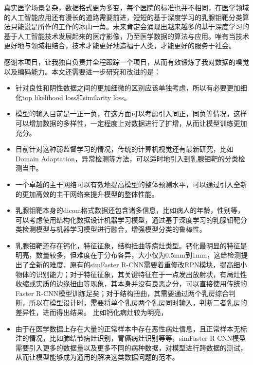 真实医学场景复杂，数据格式更为多变，每个医院的标准也并不相同，在医学领域的人工智能应用还有漫长的道路需要前进，短短的基于深度学习的乳腺钼靶分类算法只能说是所作的工作的冰山一角。未来肯定会涌现出越来越多的基于深度学习的基于人工智能技术发展起来的医疗影像，乃至医学数据的算法与应用。唯有当技术更好地与领域相结合，技术才能更好地造福于人类，才能更好的服务于社会。

感谢本项目，让我独自负责并全程跟踪一个项目，从而有效锻炼了我对数据的嗅觉以及编码能力。本文还需要进一步研究和改进的是：
\begin{itemize}
	\item 针对良性和阴性数据之间的更加细微的区别应该单独考虑，所以有必要更加细化top likelihood loss和similarity loss。
	\item 模型的输入目前是一正一负，在这方面可以考虑引入同正，同负等情况，这样可以增加数据的多样性，一定程度上对数据进行了扩增，从而让模型训练更加充分。
	\item 目前针对这种弱监督学习的情况，传统的计算机视觉还有最新研究，比如Domain Adaptation，异常检测\cite{chandola2009anomaly}等方法，可以适时地引入到乳腺钼靶的分类检测当中。
	\item 一个卓越的主干网络可以有效地提高模型的整体预测水平，可以通过引入全新的更加高效的主干网络来提升模型的整体性能。
	\item 乳腺钼靶本身的dicom格式数据还包含诸多信息，比如病人的年龄，性别等，可以考虑使用结构化数据设计机器学习模型，通过基于深度学习的乳腺钼靶分类检测模型与机器学习模型进行融合，增强模型分类的鲁棒性。
	\item 乳腺钼靶还存在钙化，特征征象，结构扭曲等病灶类型。钙化最明显的特征是明亮，数量较多，但难度在于分布各异，大小仅为0.5mm到1mm，这给检测提出了全新的难度，原有的simFaster R-CNN需要着重修改RPN模块，提高细小物体的识别能力；对于特征征象，其关键特征在于一点发出放射状，有局灶性收缩或实质的边缘扭曲等现象，其本身并没有良恶之分，可以直接使用传统的Faster R-CNN模型训练足矣；对于结构扭曲，其需要通过两个乳房综合判断，所以在模型设计时，需要将单个乳房两个乳房同时输入，判断二者乳房的差异性，进而得出结果。
	比如钙化病灶较为明亮，
	\item 由于在医学数据上存在大量的正常样本中存在恶性病灶信息，且正常样本无标注的情况，比如肺结节病灶识别，胃癌病灶识别等等，simFaster R-CNN模型需要引入更多的数据量以及更多不同的病种数据，对模型进行跨数据的测试，从而让模型能够成为通用的解决这类数据问题的范本。
\end{itemize}


